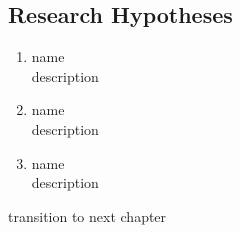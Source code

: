 \subsection{Research Hypotheses} %
\label{sub:research_hypotheses}

\begin{enumerate}
    \item name \\
    description
    \item name \\
    description
    \item name \\
    description
\end{enumerate}



\vspace{2em}
transition to next chapter
